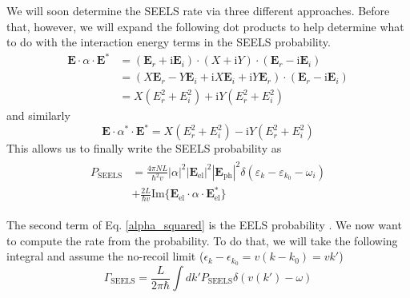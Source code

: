 \documentclass [11pt, proquest] {uwthesis}[2016/11/22]
\begin{document}
We will soon determine the SEELS rate via three different approaches. Before that, however, we will expand the following dot products to help determine what to do with the interaction energy terms in the SEELS probability.
\begin{equation}
\begin{aligned}
\textbf{E}\cdot\alpha\cdot\textbf{E}^* &= (\textbf{E}_r+\textrm{i}\textbf{E}_i)\cdot(X+\textrm{i}Y)\cdot(\textbf{E}_r-\textrm{i}\textbf{E}_i)\\
& = (X\textbf{E}_r - Y\textbf{E}_i + \textrm{i}X\textbf{E}_i + \textrm{i}Y\textbf{E}_r)\cdot(\textbf{E}_r-\textrm{i}\textbf{E}_i)\\
& = X(E_r^2 + E_i^2) + \textrm{i}Y(E_r^2 + E_i^2)
\label{alpha_1}
\end{aligned}
\end{equation}
and similarly 
\begin{equation}
\textbf{E}\cdot\alpha^*\cdot\textbf{E}^* = X(E_r^2 + E_i^2) -\textrm{i}Y(E_r^2 + E_i^2)
\label{alpha_2}
\end{equation}
This allows us to finally write the SEELS probability as
\begin{align}
\begin{split}
  P_{\textrm{SEELS}} &= \frac{4\pi NL}{\hbar^2v}|\alpha|^2|\textbf{E}_{\textrm{el}}|^2|\textbf{E}_{\textrm{ph}}|^2\delta(\varepsilon_k - \varepsilon_{k_0}-\omega_i)\\
  &+ \frac{2L}{\hbar v}\textrm{Im}\{\textbf{E}_{\textrm{el}}\cdot\alpha\cdot\textbf{E}_{\textrm{el}}^*\}
  \label{alpha_squared}
  \end{split}
\end{align}

The second term of Eq. \ref{alpha_squared} is the EELS probability \cite{EEGS}. We now want to compute the rate from the probability. To do that, we will take the following integral and assume the no-recoil limit ($\epsilon_k - \epsilon_{k_0} = v(k-k_0) = vk'$)
\begin{equation}
\Gamma_{\textrm{SEELS}} = \frac{L}{2\pi\hbar}\int dk' P_{\textrm{SEELS}} \delta(v(k')-\omega)
\label{prob_to_rate}
\end{equation}
\end{document}
